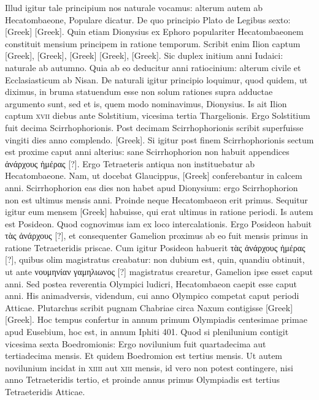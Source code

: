 Illud igitur tale principium nos naturale vocamus:
alterum autem ab Hecatombaeone, Populare dicatur.
De quo
principio Plato de Legibus sexto: \textgreek{[Greek]}
\textgreek{[Greek]}.
Quin etiam Dionysius ex Ephoro
populariter Hecatombaeonem constituit mensium principem in ratione
temporum.
Scribit enim Ilion captum \textgreek{[Greek]},
\textgreek{[Greek]}, \textgreek{[Greek]}
\textgreek{[Greek]}, \textgreek{[Greek]}.
Sic duplex initium anni
Iudaici: naturale ab autumno.
Quia ab eo deducitur anni ratiocinium:
alterum civile et Ecclasiasticum ab Nisan.
De naturali igitur
principio loquimur, quod quidem, ut diximus, in bruma statuendum
esse non solum rationes supra adductae argumento sunt, sed et is, quem
modo nominavimus, Dionysius.
Is ait Ilion captum \textsc{xvii} diebus
ante Solstitium, vicesima tertia Thargelionis.
Ergo Solstitium fuit
decima Scirrhophorionis.
Post decimam Scirrhophorionis scribit superfuisse
vingiti dies anno complendo.
\textgreek{[Greek]}.
Si igitur post finem
Scirrhophorionis sectum est proxime caput anni alterius: sane Scirrhophorion
non habuit appendices \textgreek{ἀνάρχους ἡμέρας [?]}.
Ergo Tetraeteris
antiqua non instituebatur ab Hecatombaeone.
Nam, ut docebat
Glaucippus, \textgreek{[Greek]} conferebantur in calcem anni.
Scirrhophorion
eas dies non habet apud Dionysium: ergo Scirrhophorion
non est ultimus mensis anni.
Proinde neque Hecatombaeon erit primus.
Sequitur igitur eum mensem \textgreek{[Greek]} habuisse, qui
erat ultimus in ratione periodi.
Is autem est Posideon.
Quod cognovimus
iam ex loco intercalationis.
Ergo Posideon habuit \textgreek{τὰς ἀνάρχους [?]}, et
consequenter Gamelion proximus ab eo fuit mensis primus in ratione
Tetraeteridis priscae.
Cum igitur Posideon habuerit \textgreek{τὰς ἀνάρχους ἡμέρας [?]},
quibus olim magistratus creabatur: non dubium est, quin, quandiu
obtinuit, ut ante \textgreek{νουμηνίαν γαμηλιωνος [?]} magistratus crearetur,
Gamelion ipse esset caput anni.
Sed postea reverentia Olympici ludicri,
Hecatombaeon caepit esse caput anni.
His animadversis, videndum,
cui anno Olympico competat caput periodi Atticae.
Plutarchus scribit
pugnam Chabriae circa Naxum contigisse \textgreek{[Greek]}
\textgreek{[Greek]}.
Hoc tempus confertur in annum primum
Olympiadis centesimae primae apud Eusebium, hoc est, in annum
Iphiti 401.
Quod si plenilunium contigit vicesima sexta Boedromionis:
Ergo novilunium fuit quartadecima aut tertiadecima mensis.
Et quidem Boedromion est tertius mensis.
Ut autem novilunium incidat in
\textsc{xiiii} aut \textsc{xiii} mensis, id vero non potest contingere,
 nisi anno Tetraeteridis
tertio, et proinde annus primus Olympiadis est tertius Tetraeteridis
Atticae.

